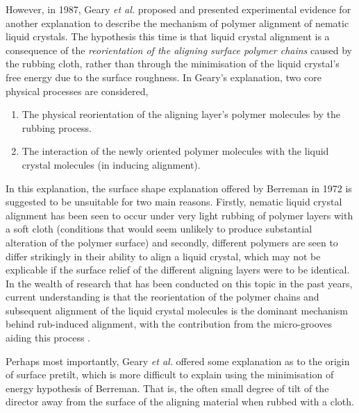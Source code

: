 However, in 1987, Geary \textit{et al.} \cite{Geary1987} proposed and presented experimental evidence for another explanation to describe the mechanism of polymer alignment of nematic liquid crystals. The hypothesis this time is that liquid crystal alignment is a consequence of the \textit{reorientation of the aligning surface polymer chains} caused by the rubbing cloth, rather than through the minimisation of the liquid crystal's free energy due to the surface roughness. In Geary's explanation, two core physical processes are considered,

\begin{enumerate}
\item The physical reorientation of the aligning layer's polymer molecules by the rubbing process.
\item The interaction of the newly oriented polymer molecules with the liquid crystal molecules (in inducing alignment).
\end{enumerate}
 
In this explanation, the surface shape explanation offered by Berreman in 1972 is suggested to be unsuitable for two main reasons. Firstly, nematic liquid crystal alignment has been seen to occur under very light rubbing of polymer layers with a soft cloth (conditions that would seem unlikely to produce substantial alteration of the polymer surface) and secondly, different polymers are seen to differ strikingly in their ability to align a liquid crystal, which may not be explicable if the surface relief of the different aligning layers were to be identical. In the wealth of research that has been conducted on this topic in the past years, current understanding is that the reorientation of the polymer chains and subsequent alignment of the liquid crystal molecules is the dominant mechanism behind rub-induced alignment, with the contribution from the micro-grooves aiding this process \cite{Mahajan1998}.

Perhaps most importantly, Geary \textit{et al.} offered some explanation as to the origin of surface pretilt, which is more difficult to explain using the minimisation of energy hypothesis of Berreman. That is, the often small degree of tilt of the director away from the surface of the aligning material when rubbed with a cloth.

